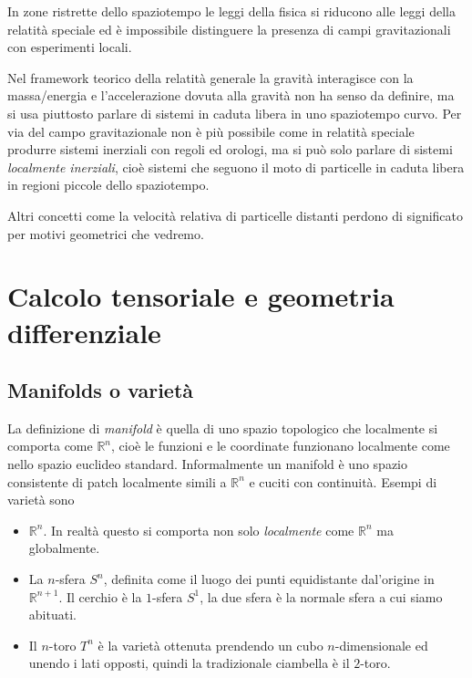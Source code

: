 \documentclass[twoside]{article}
\begin{document}
\begin{textbf}
In zone ristrette dello spaziotempo le leggi della fisica si riducono alle leggi della relatità speciale ed è impossibile distinguere la presenza di campi gravitazionali con esperimenti locali.
\end{textbf}

Nel framework teorico della relatità generale la gravità interagisce con la massa/energia e l'accelerazione dovuta alla gravità non ha senso da definire, ma si usa piuttosto parlare di sistemi in caduta libera in uno spaziotempo curvo.
Per via del campo gravitazionale non è più possibile come in relatità speciale produrre sistemi inerziali con regoli ed orologi, ma si può solo parlare di sistemi \emph{localmente inerziali}, cioè sistemi che seguono il moto di particelle in caduta libera in regioni piccole dello spaziotempo. 

Altri concetti come la velocità relativa di particelle distanti perdono di significato per motivi geometrici che vedremo.

\newpage

\section{Calcolo tensoriale e geometria differenziale}
\subsection{Manifolds o varietà}
La definizione di \emph{manifold} è quella di uno spazio topologico che localmente si comporta come $\mathbb{R}^n$, cioè le funzioni e le coordinate funzionano localmente come nello spazio euclideo standard. Informalmente un manifold è uno spazio consistente di patch localmente simili a $\mathbb{R}^n$ e cuciti con continuità. Esempi di varietà sono
\begin{itemize}
	\item $\mathbb{R}^{n}$. In realtà questo si comporta non solo \emph{localmente} come $\mathbb{R}^n$ ma globalmente.
	\item La $n$-sfera $S^n$, definita come il luogo dei punti equidistante dal'origine in $\mathbb{R}^{n+1}$. Il cerchio è la $1$-sfera $S^1$, la due sfera è la normale sfera a cui siamo abituati.
\item Il $n$-toro $T^n$ è la varietà ottenuta prendendo un cubo $n$-dimensionale ed unendo i lati opposti, quindi la tradizionale ciambella è il $2$-toro.
\end{itemize}
\end{document}
